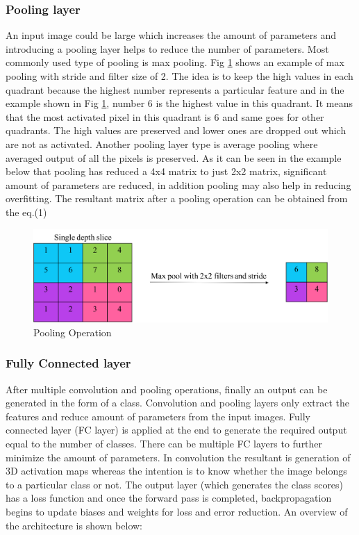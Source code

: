 \documentclass[11pt]{article}
\begin{document}
\subsubsection{Pooling layer}
An input image could be large which increases the amount of parameters and introducing a pooling layer helps to reduce the number of parameters. Most commonly used type of pooling is max pooling. Fig \ref{fig:Pooling Operation} shows an example of max pooling with stride and filter size of 2. The idea is to keep the high values in each quadrant because the highest number represents a particular feature and in the example shown in Fig \ref{fig:Pooling Operation}, number 6 is the highest value in this quadrant. It means that the most activated pixel in this quadrant is 6 and same goes for other quadrants. The high values are preserved and lower ones are dropped out which are not as activated. Another pooling layer type is average pooling where averaged output of all the pixels is preserved. As it can be seen in the example below that pooling has reduced a 4x4 matrix to just 2x2 matrix, significant amount of parameters are reduced, in addition pooling may also help in reducing overfitting. The resultant matrix after a pooling operation can be obtained from the eq.(1) 

\begin{figure}[H]
	\includegraphics[width=\linewidth]{files/cnn_architecture/pooling.png}
	\caption{Pooling Operation}
	\label{fig:Pooling Operation}
\end{figure}


\subsubsection{Fully Connected layer}
After multiple convolution and pooling operations, finally an output can be generated in the form of a class. Convolution and pooling layers only extract the features and reduce amount of parameters from the input images. Fully connected layer (FC layer) is applied at the end to generate the required output equal to the number of classes. There can be multiple FC layers to further minimize the amount of parameters. In convolution the resultant is generation of 3D activation maps whereas the intention is to know whether the image belongs to a particular class or not. The output layer (which generates the class scores) has a loss function and once the forward pass is completed, backpropagation begins to update biases and weights for loss and error reduction. An overview of the architecture is shown below:
\end{document}
